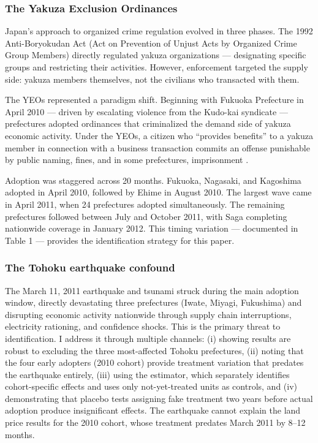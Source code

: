 \documentclass[12pt]{article}
\begin{document}
\subsubsection*{The Yakuza Exclusion Ordinances} Japan's approach to organized crime regulation evolved in three phases. The 1992 Anti-Boryokudan Act (Act on Prevention of Unjust Acts by Organized Crime Group Members) directly regulated yakuza organizations --- designating specific groups and restricting their activities. However, enforcement targeted the supply side: yakuza members themselves, not the civilians who transacted with them.

The YEOs represented a paradigm shift. Beginning with Fukuoka Prefecture in April 2010 --- driven by escalating violence from the Kudo-kai syndicate --- prefectures adopted ordinances that criminalized the demand side of yakuza economic activity. Under the YEOs, a citizen who ``provides benefits'' to a yakuza member in connection with a business transaction commits an offense punishable by public naming, fines, and in some prefectures, imprisonment \citep{hoshino2020containing}.

Adoption was staggered across 20 months. Fukuoka, Nagasaki, and Kagoshima adopted in April 2010, followed by Ehime in August 2010. The largest wave came in April 2011, when 24 prefectures adopted simultaneously. The remaining prefectures followed between July and October 2011, with Saga completing nationwide coverage in January 2012. This timing variation --- documented in \citet{hoshino2020containing} Table 1 --- provides the identification strategy for this paper.

\subsubsection*{The Tohoku earthquake confound} The March 11, 2011 earthquake and tsunami struck during the main adoption window, directly devastating three prefectures (Iwate, Miyagi, Fukushima) and disrupting economic activity nationwide through supply chain interruptions, electricity rationing, and confidence shocks. This is the primary threat to identification. I address it through multiple channels: (i) showing results are robust to excluding the three most-affected Tohoku prefectures, (ii) noting that the four early adopters (2010 cohort) provide treatment variation that predates the earthquake entirely, (iii) using the \citet{callaway2021difference} estimator, which separately identifies cohort-specific effects and uses only not-yet-treated units as controls, and (iv) demonstrating that placebo tests assigning fake treatment two years before actual adoption produce insignificant effects. The earthquake cannot explain the land price results for the 2010 cohort, whose treatment predates March 2011 by 8--12 months.
\end{document}
